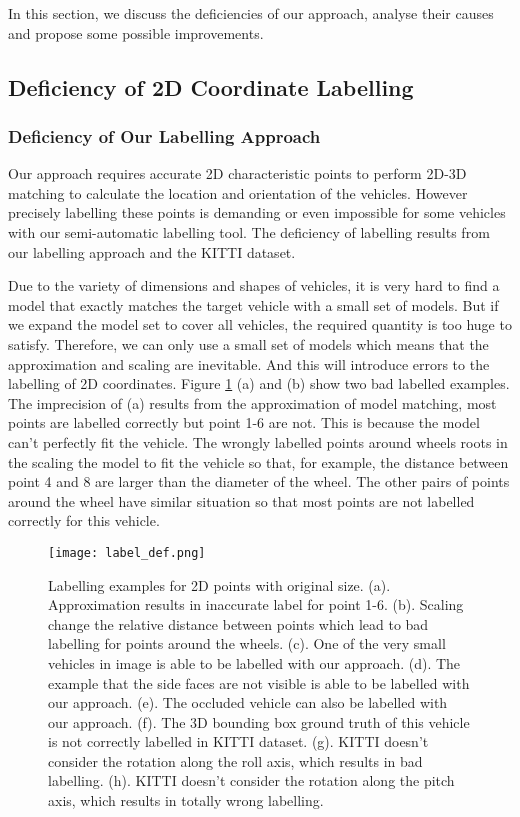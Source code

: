 
In this section, we discuss the deficiencies of our approach, analyse their causes and propose some possible improvements.

\subsection{Deficiency of 2D Coordinate Labelling}
\label{2d_def}
\subsubsection{Deficiency of Our Labelling Approach}
Our approach requires accurate 2D characteristic points to perform 2D-3D matching to calculate the location and orientation of the vehicles. However precisely labelling these points is demanding or even impossible for some vehicles with our semi-automatic labelling tool. The deficiency of labelling results from our labelling approach and the KITTI dataset.

Due to the variety of dimensions and shapes of vehicles, it is very hard to find a model that exactly matches the target vehicle with a small set of models. But if we expand the model set to cover all vehicles, the required quantity is too huge to satisfy. Therefore, we can only use a small set of models which means that the approximation and scaling are inevitable. And this will introduce errors to the labelling of 2D coordinates. Figure \ref{figure:label_def} (a) and (b) show two bad labelled examples. The imprecision of (a) results from the approximation of model matching, \ie most points are labelled correctly but point 1-6 are not. This is because the model can't perfectly fit the vehicle. The wrongly labelled points around wheels roots in the scaling the model to fit the vehicle so that, for example, the distance between point 4 and 8 are larger than the diameter of the wheel. The other pairs of points around the wheel have similar situation so that most points are not labelled correctly for this vehicle.

\begin{figure}[H]		
	\texttt{[image: label\_def.png]}
	\caption{Labelling examples for 2D points with original size. (a). Approximation results in inaccurate label for point 1-6. (b). Scaling change the relative distance between points which lead to bad labelling for points around the wheels. (c). One of the very small vehicles in image is able to be labelled with our approach. (d). The example that the side faces are not visible is able to be labelled with our approach. (e). The occluded vehicle can also be labelled with our approach. (f). The 3D bounding box ground truth of this vehicle is not correctly labelled in KITTI dataset. (g). KITTI doesn't consider the rotation along the roll axis, which results in bad labelling. (h). KITTI doesn't consider the rotation along the pitch axis, which results in totally wrong labelling.}
	\centering
	\label{figure:label_def}
\end{figure}

